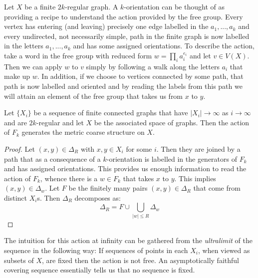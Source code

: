 \begin{conjecture}
\begin{remark}
Let $X$ be a finite $2k$-regular graph. A $k$-orientation can be thought of as providing a recipe to understand the action provided by the free group. Every vertex has entering (and leaving) precisely one edge labelled in the $a_{1},...,a_{k}$ and every undirected, not necessarily simple, path in the finite graph is now labelled in the letters $a_{1},...,a_{k}$ and has some assigned orientations. To describe the action, take a word in the free group with reduced form $w=\prod_{i}a_{i}^{e_{i}}$ and let $v \in V(X)$. Then we can apply $w$ to $v$ simply by following a walk along the letters $a_{i}$ that make up $w$. In addition, if we choose to vertices connected by some path, that path is now labelled and oriented and by reading the labels from this path we will attain an element of the free group that takes us from $x$ to $y$.
\end{remark}

\begin{lemma}\label{Lem:MT2}
Let $\lbrace X_{i} \rbrace$ be a sequence of finite connected graphs that have $\vert X_{i} \vert \rightarrow \infty$ as $i \rightarrow \infty$ and are $2k$-regular and let $X$ be the associated space of graphs. Then the action of $F_{k}$ generates the metric coarse structure on $X$.
\end{lemma}
\begin{proof}
Let $(x,y) \in \Delta_{R}$ with $x,y \in X_{i}$ for some $i$. Then they are joined by a path that as a consequence of a $k$-orientation is labelled in the generators of $F_{k}$ and has assigned orientations. This provides us enough information to read the action of $F_{k}$, whence there is a $w \in F_{k}$ that takes $x$ to $y$. This implies $(x,y) \in \Delta_{w}$. Let $F$ be the finitely many pairs $(x,y) \in \Delta_{R}$ that come from distinct $X_{i}$s. Then $\Delta_{R}$ decomposes as:
\begin{equation*}
\Delta_{R} = F \cup \bigcup_{\vert w \vert \leq R} \Delta_{w}
\end{equation*}

\end{proof}

The intuition for this action at infinity can be gathered from the \textit{ultralimit} of the sequence in the following way: If sequences of points in each $X_{i}$, when viewed as subsets of $X$, are fixed then the action is not free. An asymptotically faithful covering sequence essentially tells us that no sequence is fixed.


\end{conjecture}
